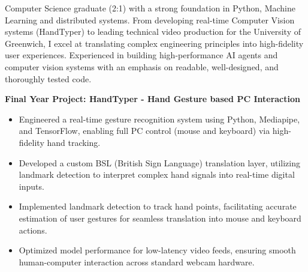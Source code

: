 \documentclass[10pt,a4paper,ragged2e]{altacv}
\begin{document}
\begin{fullwidth}
\makecvheader
\end{fullwidth}



Computer Science graduate (2:1) with a strong foundation in Python, Machine Learning and distributed systems. 
From developing real-time Computer Vision systems (HandTyper) to leading technical video production
for the University of Greenwich, I excel at translating complex engineering principles into
high-fidelity user experiences. Experienced in building high-performance AI agents and computer vision systems with an emphasis on readable, well-designed, and thoroughly tested code.
\\



\smallskip

\textbf{Final Year Project: HandTyper - Hand Gesture based PC Interaction} \\
\begin{itemize}
  \item Engineered a real-time gesture recognition system using Python, Mediapipe, and TensorFlow, enabling full PC control (mouse and keyboard) via high-fidelity hand tracking.
  \item Developed a custom BSL (British Sign Language) translation layer, utilizing landmark detection to interpret complex hand signals into real-time digital inputs.
  \item Implemented landmark detection to track hand points, facilitating accurate estimation of user gestures for seamless translation into mouse and keyboard actions.
  \item Optimized model performance for low-latency video feeds, ensuring smooth human-computer interaction across standard webcam hardware.
\end{itemize}
\end{document}
